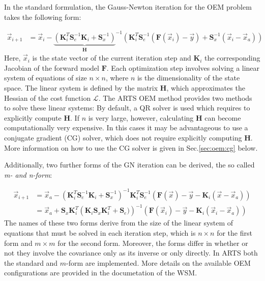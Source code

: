In the standard formulation, the Gauss-Newton iteration for the OEM problem
takes the following form:

\begin{eqnarray}\label{eq:oem:gn}
\vec{x}_{i + 1} &= \vec{x}_i - 
{\underbrace{ (
  \mathbf{K}_i^T \mathbf{S}_e^{-1} \mathbf{K}_i + \mathbf{S}^{-1}_x
)} _{ \mathbf{H}}} ^{-1}
(\mathbf{K}_i^T\mathbf{S}^{-1}_e (\mathbf{F}(\vec{x}_i) - \vec{y}) + \mathbf{S}_x^{-1}(\vec{x}_i - \vec{x}_a) )
 \end{eqnarray}
Here, $\vec{x}_i$ is the state vector of the current iteration step
and $\mathbf{K}_i$ the corresponding Jacobian of the forward model $\mathbf{F}$.
Each optimization step involves solving a linear system of equations
 of size $n \times n$, where $n$ is the dimensionality of the state space.
The linear system is defined by the matrix $\mathbf{H}$, which approximates 
the Hessian of the cost function $\mathcal{L}$. The ARTS OEM method provides two methods
to solve these linear systems: By default, a QR solver is used which requires to
explicitly compute $\mathbf{H}$. If $n$ is very large, however, calculating
 $\mathbf{H}$ can become computationally very expensive. In this cases it may be
 advantageous to use a conjugate gradient (CG) solver, which does not require explicitly
computing $\mathbf{H}$. More information on how to use the CG solver is given in
 Sec.\ref{sec:oem:cg} below.

Additionally, two further forms of the GN iteration can be derived, the so called
\textit{m- and n-form}:

\begin{eqnarray}
\vec{x}_{i + 1} &= \vec{x}_a - 
\left (\mathbf{K}_i^T \mathbf{S}_e^{-1} \mathbf{K}_i + \mathbf{S}_x^{-1} \right )^{-1} \mathbf{K}_i^T\mathbf{S}_e^{-1}
\left(\mathbf{F}(\vec{x}) - \vec{y} - \mathbf{K}_i(\vec{x} - \vec{x}_a) \right ) \\
&= \vec{x}_a  + \mathbf{S}_x \mathbf{K}_i ^ T
 \left (\mathbf{K}_i \mathbf{S}_x \mathbf{K}_i^T + \mathbf{S}_e) \right )^{-1}
\left ( \mathbf{F}(\vec{x}_i) - \vec{y} - \mathbf{K}_i(\vec{x}_i - \vec{x}_a) \right)
\end{eqnarray}
The names of these two forms derive from the size of the linear system of equations
that must be solved in each iteration step, which is $n \times n$ for the first
form and $m \times m$ for the second form. Moreover, the forms differ in whether
or not they involve the covariance only as its inverse or only directly. In ARTS
both the standard and $m$-form are implemented. More details on the available
OEM configurations are provided in the documetation of the  WSM.


